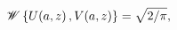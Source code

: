 \[\mathop{\mathscr{W}\/}\nolimits\left\{\mathop{U\/}\nolimits\!\left(a,z\right),%
\mathop{V\/}\nolimits\!\left(a,z\right)\right\}=\sqrt{2/\pi},\]